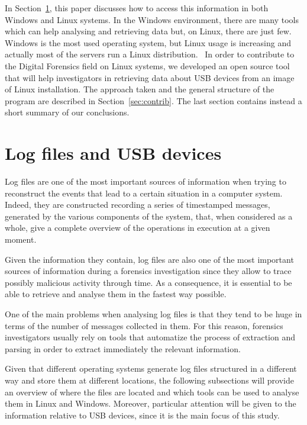 \documentclass[a4paper]{article}
\begin{document}
In Section~\ref{sec:lit}, this paper discusses how to access this information
in both Windows and Linux systems. In the Windows environment, there are many
tools which can help analysing and retrieving data but, on Linux, there are
just few. Windows is the most used operating system, but Linux usage is
increasing and actually most of the servers run a Linux
distribution.~\cite{InternetServer} In order to contribute to the
Digital Forensics field on Linux systems, we developed an open source tool that
will help investigators in retrieving data about USB devices from an image of
Linux installation. The approach taken and the general structure of the program
are described in Section~\ref{sec:contrib}. The last section contains instead a
short summary of our conclusions.

\section{Log files and USB devices}
\label{sec:lit}
Log files are one of the most important sources of information when trying to
reconstruct the events that lead to a certain situation in a computer system.
Indeed, they are constructed recording a series of timestamped messages,
generated by the various components of the system, that, when considered as a
whole, give a complete overview of the operations in execution at a given
moment.

Given the information they contain, log files are also one of the most important
sources of information during a forensics investigation since they allow to
trace possibly malicious activity through time. As a consequence, it is
essential to be able to retrieve and analyse them in the fastest way
possible.~\cite{finlayson1987log}

One of the main problems when analysing log files is that they tend to be huge
in terms of the number of messages collected in them. For this reason, forensics
investigators usually rely on tools that automatize the process of extraction
and parsing in order to extract immediately the relevant information.

Given that different operating systems generate log files structured in a
different way and store them at different locations, the following subsections
will provide an overview of where the files are located and which tools can
be used to analyse them in Linux and Windows. Moreover, particular attention
will be given to the information relative to USB devices, since it is the main
focus of this study.
\end{document}

